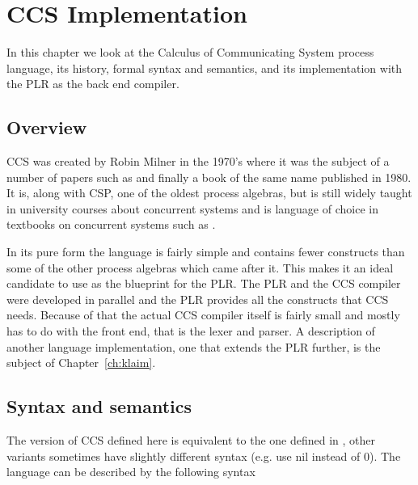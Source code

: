 \chapter{CCS Implementation}\label{ch:ccs_implementation}

	In this chapter we look at the Calculus of Communicating System process 
	language, its history, formal syntax and semantics, and its implementation 
	with the PLR as the back end compiler. 
	
\section{Overview}

	CCS was created by Robin Milner in the 1970's where it was the subject of a 
	number of papers such as \cite{milner1,milner2,milner3} and finally a book 
	of the same name \cite{Milner80} published in 1980. It is, along with CSP, 
	one of the oldest process algebras, but is still widely taught in university 
	courses about concurrent systems and is language of choice in textbooks on 
	concurrent systems such as \cite{reactive}. 
	
	In its pure form the language is fairly simple and contains fewer constructs 
	than some of the other process algebras which came after it. This makes it 
	an ideal candidate to use as the blueprint for the PLR. The PLR and the CCS 
	compiler were developed in parallel and the PLR provides all the constructs 
	that CCS needs. Because of that the actual CCS compiler itself is fairly 
	small and mostly has to do with the front end, that is the lexer and parser. 
	A description of another language implementation, one that extends the PLR 
	further, is the subject of Chapter~\ref{ch:klaim}.
	
\section{Syntax and semantics}\label{sec:ccs_syntax}

	The version of CCS defined here is equivalent to the one defined in 
	\cite{reactive}, other variants sometimes have slightly different syntax 
	(e.g. use \textsf{nil} instead of 0). The language can be described by the 
	following syntax

